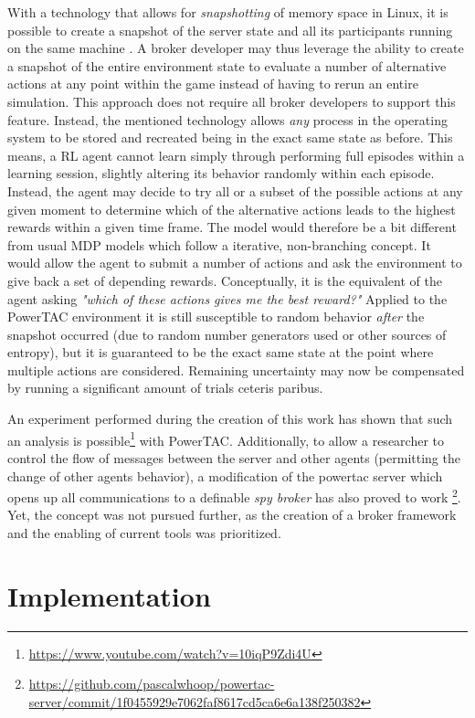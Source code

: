 With a technology that allows for \emph{snapshotting} of memory space in Linux, it is possible to create a snapshot of
the server state and all its participants running on the same machine \citep{criu}. A broker developer may thus leverage the
ability to create a snapshot of the entire environment state to evaluate a number of alternative actions at any point
within the game instead of having to rerun an entire simulation. This approach does not require all broker developers to
support this feature. Instead, the mentioned technology allows \emph{any} process in the operating
system to be stored and recreated being in the exact same state as before. This means, a \ac{RL} agent cannot learn simply
through performing full episodes within a learning session, slightly altering its behavior randomly within each episode.
Instead, the agent may decide to try all or a subset of the possible actions at any given moment to determine which of
the alternative actions leads to the highest rewards within a given time frame. The model would therefore be a bit
different from usual \ac{MDP} models which follow a iterative, non-branching concept. It would allow the agent to submit
a number of actions and ask the environment to give back a set of depending rewards. Conceptually, it is the equivalent
of the agent asking \emph{"which of these actions gives me the best reward?"} Applied to the \ac{PowerTAC} environment
it is still susceptible to random behavior \emph{after} the snapshot occurred (due to random number generators used or
other sources of entropy), but it is guaranteed to be the exact same state at the point where multiple actions are
considered. Remaining uncertainty may now be compensated by running a significant amount of trials ceteris paribus.

An experiment performed during the creation of this work has shown that such an analysis is
possible\footnote{\url{https://www.youtube.com/watch?v=10iqP9Zdi4U}} with \ac{PowerTAC}. Additionally, to allow a
researcher to control the flow of messages between the server and other agents (permitting the change of other agents
behavior), a modification of the powertac server which opens up all communications to a definable \emph{spy broker} has
also proved to work
\footnote{\url{https://github.com/pascalwhoop/powertac-server/commit/1f0455929e7062faf8617cd5ca6e6a138f250382}}. Yet,
the concept was not pursued further, as the creation of a broker framework and the enabling of current tools was
prioritized.

\section{Implementation }
\label{sec:implementation}

